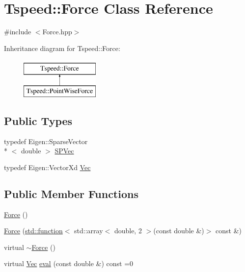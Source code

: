\hypertarget{classTspeed_1_1Force}{\section{Tspeed\-:\-:Force Class Reference}
\label{classTspeed_1_1Force}
}


{\ttfamily \#include $<$Force.\-hpp$>$}

Inheritance diagram for Tspeed\-:\-:Force\-:\begin{figure}[H]
\begin{center}
\leavevmode
\includegraphics[height=2.000000cm]{classTspeed_1_1Force}
\end{center}
\end{figure}
\subsection*{Public Types}
\begin{DoxyCompactItemize}
\item 
typedef Eigen\-::\-Sparse\-Vector\\*
$<$ double $>$ \hyperlink{classTspeed_1_1Force_a5f4cd0ccfce951a7edded01c87ba6fb6}{S\-P\-Vec}
\item 
typedef Eigen\-::\-Vector\-Xd \hyperlink{classTspeed_1_1Force_ab33d4f6bed9bf9a136afd1ac5a918c93}{Vec}
\end{DoxyCompactItemize}
\subsection*{Public Member Functions}
\begin{DoxyCompactItemize}
\item 
\hyperlink{classTspeed_1_1Force_a1763e5fb61e4ef56be851800d854c96d}{Force} ()
\item 
\hyperlink{classTspeed_1_1Force_a802a5b025cfde563e3c874c0dc3cb858}{Force} (\hyperlink{vtk__vector__out_8m_a6235d6cebbf2f77ca6dbae2811d86530}{std\-::function}$<$ std\-::array$<$ double, 2 $>$(const double \&)$>$ const \&)
\item 
virtual \hyperlink{classTspeed_1_1Force_aa4789eaa544d8b37d25873a6c8aede55}{$\sim$\-Force} ()
\item 
virtual \hyperlink{classTspeed_1_1Force_ab33d4f6bed9bf9a136afd1ac5a918c93}{Vec} \hyperlink{classTspeed_1_1Force_ac174525b11c7c6a490411d00330a3564}{eval} (const double \&) const =0
\end{DoxyCompactItemize}
